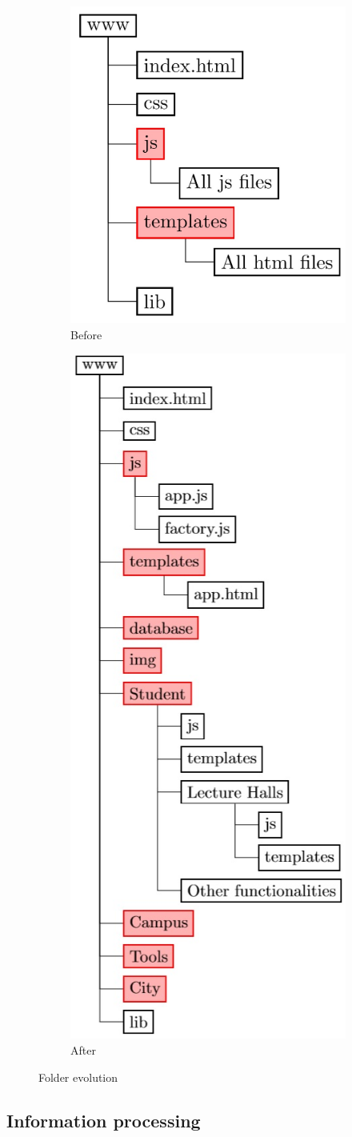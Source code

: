 \documentclass{eplmastersthesis}
\begin{document}
\begin{figure}[H]
\centering
\begin{subfigure}[b]{0.5\textwidth}
   \includegraphics[width=.4\linewidth]{Images/folder_before.jpg}
  \caption{Before}
  \label{fig:before}
\end{subfigure}%
\begin{subfigure}[b]{.5\textwidth}
  \includegraphics[width=.4\linewidth]{Images/folder_after.jpg}
  \caption{After}
  \label{fig:sub2}
\end{subfigure}
\caption{Folder evolution}
\label{fig:test}
\end{figure}

\subsection{Information processing}
\end{document}
